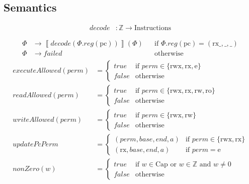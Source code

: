 \documentclass{article}
\newcommand{\sem}[1]{\left\llbracket #1 \right\rrbracket}
\newcommand{\false}{\mathit{false}}
\newcommand{\true}{\mathit{true}}
\newcommand{\var}[1]{\mathit{#1}}
\newcommand{\pcreg}{\mathrm{pc}}
\newcommand{\addr}{\var{a}}
\newcommand{\start}{\var{base}}
\newcommand{\addrend}{\var{end}}
\newcommand{\reg}{\var{reg}}
\newcommand{\perm}{\var{perm}}
\newcommand{\failed}{\mathit{failed}}
\newcommand{\plainfun}[1]{\mathit{#1}}
\newcommand{\decode}{\plainfun{decode}}
\newcommand{\updatePcPerm}[1]{\plainfun{updatePcPerm}}
\newcommand{\executeAllowed}[1]{\plainfun{executeAllowed}(#1)}
\newcommand{\nonZero}[1]{\plainfun{nonZero}(#1)}
\newcommand{\readAllowed}[1]{\plainfun{readAllowed}(#1)}
\newcommand{\writeAllowed}[1]{\plainfun{writeAllowed}(#1)}
\newcommand{\plaindom}[1]{\mathrm{#1}}
\newcommand{\Caps}{\plaindom{Cap}}
\newcommand{\Instrs}{\plaindom{Instructions}}
\newcommand{\ints}{\mathbb{Z}}
\newcommand{\plainperm}[1]{\mathrm{#1}}
\newcommand{\readonly}{\plainperm{ro}}
\newcommand{\readwrite}{\plainperm{rw}}
\newcommand{\exec}{\plainperm{rx}}
\newcommand{\entry}{\plainperm{e}}
\newcommand{\rwx}{\plainperm{rwx}}
\begin{document}
\subsection*{Semantics}
\begin{align*}
\decode &:\ints \rightarrow \Instrs
\end{align*}

\begin{align*}
\Phi & \rightarrow \sem{\decode(\Phi.\reg(\pcreg))}(\Phi) & & \text{if $\Phi.\reg(\pcreg) = (\exec{\_},{\_},{\_})$} \\
\Phi & \rightarrow \failed                                      & & \text{otherwise}
\end{align*}
\begin{align*}
  \executeAllowed{\perm} &=
                           \begin{cases}
                             \true & \text{if } \perm \in \{ \rwx, \exec, \entry \} \\
                             \false & \text{otherwise}
                           \end{cases} \\
  \readAllowed{\perm} &=
                           \begin{cases}
                             \true & \text{if } \perm \in \{ \rwx, \exec, \readwrite, \readonly \} \\
                             \false & \text{otherwise}
                           \end{cases} \\
  \writeAllowed{\perm} &=
                           \begin{cases}
                             \true & \text{if } \perm \in \{ \rwx, \readwrite\} \\
                             \false & \text{otherwise}
                           \end{cases} \\
  \updatePcPerm{\perm,\start,\addrend,\addr} &=
                                     \begin{cases}
                                       (\perm,\start,\addrend,\addr) & \text{if $\perm\in\{ \rwx, \exec \}$} \\
                                       (\exec,\start,\addrend,\addr) & \text{if $\perm = \entry$}
                                     \end{cases} \\
  \nonZero{w} &=
                \begin{cases}
                  \true & \text{if $w\in \Caps$ or $w\in \ints$ and $w \neq 0$}\\
                  \false & \text{otherwise}
                \end{cases}
\end{align*}
\end{document}
